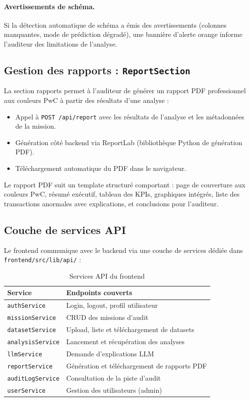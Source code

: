 \documentclass[12pt,a4paper,twoside]{report}
\begin{document}
\paragraph{Avertissements de schéma.}
Si la détection automatique de schéma a émis des avertissements (colonnes manquantes, mode de prédiction dégradé), une bannière d'alerte orange informe l'auditeur des limitations de l'analyse.

\subsection{Gestion des rapports : \texttt{ReportSection}}

La section rapports permet à l'auditeur de générer un rapport PDF professionnel aux couleurs PwC à partir des résultats d'une analyse :

\begin{itemize}
  \item Appel à \texttt{POST /api/report} avec les résultats de l'analyse et les métadonnées de la mission.
  \item Génération côté backend via ReportLab (bibliothèque Python de génération PDF).
  \item Téléchargement automatique du PDF dans le navigateur.
\end{itemize}

Le rapport PDF suit un template structuré comportant : page de couverture aux couleurs PwC, résumé exécutif, tableau des KPIs, graphiques intégrés, liste des transactions anormales avec explications, et conclusions pour l'auditeur.

\subsection{Couche de services API}

Le frontend communique avec le backend via une couche de services dédiée dans \texttt{frontend/src/lib/api/} :

\begin{table}[H]
\centering
\caption{Services API du frontend}
\label{tab:api_services}
\begin{tabular}{ll}
\toprule
\textbf{Service}          & \textbf{Endpoints couverts} \\
\midrule
\texttt{authService}      & Login, logout, profil utilisateur \\
\texttt{missionService}   & CRUD des missions d'audit \\
\texttt{datasetService}   & Upload, liste et téléchargement de datasets \\
\texttt{analysisService}  & Lancement et récupération des analyses \\
\texttt{llmService}       & Demande d'explications LLM \\
\texttt{reportService}    & Génération et téléchargement de rapports PDF \\
\texttt{auditLogService}  & Consultation de la piste d'audit \\
\texttt{userService}      & Gestion des utilisateurs (admin) \\
\bottomrule
\end{tabular}
\end{table}
\end{document}
